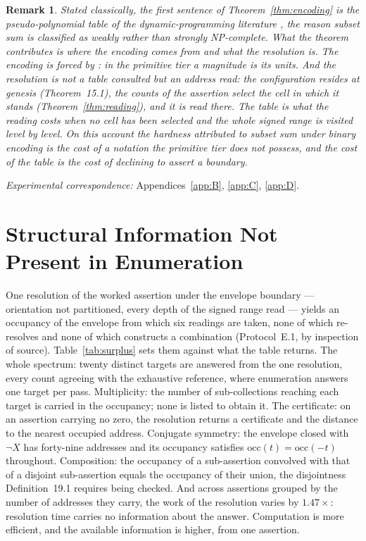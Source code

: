 \documentclass[pdflatex,sn-mathphys-num]{sn-jnl}
\theoremstyle{thmstyleone}%
\theoremstyle{thmstyletwo}%
\newtheorem{remark}{Remark}[section]
\theoremstyle{thmstylethree}%
\newtheorem{remark}{Remark}[section]
\newcommand{\PA}{\cite{Swanagon2026PA}}
\begin{document}
\begin{remark}
Stated classically, the first sentence of Theorem~\ref{thm:encoding} is the pseudo-polynomial table of the dynamic-programming literature \citep{Bellman1957,GareyJohnson1979}, the reason subset sum is classified as weakly rather than strongly NP-complete. What the theorem contributes is where the encoding comes from and what the resolution is. The encoding is forced by \PA{}: in the primitive tier a magnitude is its units. And the resolution is not a table consulted but an address read: the configuration resides at genesis (Theorem~15.1), the counts of the assertion select the cell in which it stands (Theorem~\ref{thm:reading}), and it is read there. The table is what the reading costs when no cell has been selected and the whole signed range is visited level by level. On this account the hardness attributed to subset sum under binary encoding is the cost of a notation the primitive tier does not possess, and the cost of the table is the cost of declining to assert a boundary.
\end{remark}

\noindent\emph{Experimental correspondence:} Appendices~\ref{app:B}, \ref{app:C}, \ref{app:D}.

\section{Structural Information Not Present in Enumeration}\label{sec:surplus}
One resolution of the worked assertion under the envelope boundary --- orientation not partitioned, every depth of the signed range read --- yields an occupancy of the envelope from which six readings are taken, none of which re-resolves and none of which constructs a combination (Protocol~E.1, by inspection of source). Table~\ref{tab:surplus} sets them against what the table returns. The whole spectrum: twenty distinct targets are answered from the one resolution, every count agreeing with the exhaustive reference, where enumeration answers one target per pass. Multiplicity: the number of sub-collections reaching each target is carried in the occupancy; none is listed to obtain it. The certificate: on an assertion carrying no zero, the resolution returns a certificate and the distance to the nearest occupied address. Conjugate symmetry: the envelope closed with $\neg X$ has forty-nine addresses and its occupancy satisfies $\mathrm{occ}(t)=\mathrm{occ}(-t)$ throughout. Composition: the occupancy of a sub-assertion convolved with that of a disjoint sub-assertion equals the occupancy of their union, the disjointness Definition~19.1 requires being checked. And across assertions grouped by the number of addresses they carry, the work of the resolution varies by $1.47\times$: resolution time carries no information about the answer. Computation is more efficient, and the available information is higher, from one assertion.
\end{document}
